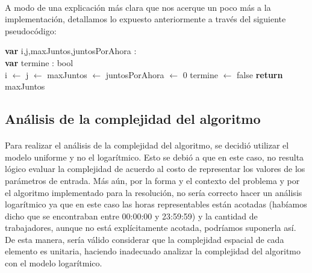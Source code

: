 \paragraph{}
A modo de una explicaci\'on m\'as clara que nos acerque un poco m\'as a la implementaci\'on, detallamos lo expuesto anteriormente a trav\'es del siguiente pseudoc\'odigo:

	\incmargin{1em}
	\linesnumbered

		\begin{algorithm}[H]
			\BlankLine
			\textbf{var} i,j,maxJuntos,juntosPorAhora : \entero \\
			\textbf{var} termine : bool \\
			\BlankLine
			i $\leftarrow$ j $\leftarrow$ maxJuntos $\leftarrow$ juntosPorAhora $\leftarrow$ 0
			termine $\leftarrow$ false
			\BlankLine
			\BlankLine
			\textbf{return} maxJuntos
		\end{algorithm}


\subsection{Análisis de la complejidad del algoritmo}

\paragraph{}
Para realizar el análisis de la complejidad del algoritmo, se decidió utilizar el modelo uniforme y no el logarítmico. Esto se debió a que en este caso, no resulta lógico evaluar la complejidad de acuerdo al costo de representar los valores de los parámetros de entrada. Más aún, por la forma y el contexto del problema y por el algoritmo implementado para la resolución, no sería correcto hacer un análisis logarítmico ya que en este caso las horas representables están acotadas (habíamos dicho que se encontraban entre 00:00:00 y 23:59:59) y la cantidad de trabajadores, aunque no está explícitamente acotada, podríamos suponerla así. De esta manera, sería válido considerar que la complejidad espacial de cada elemento es unitaria, haciendo inadecuado analizar la complejidad del algoritmo con el modelo logarítmico.

